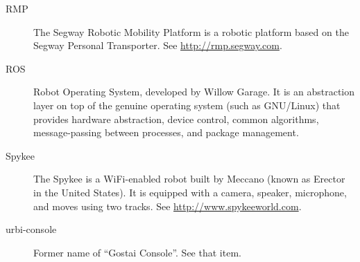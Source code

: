 \begin{description}
\item[RMP] The Segway Robotic Mobility Platform is a robotic platform based
  on the Segway Personal Transporter.  See \url{http://rmp.segway.com}.

\item[ROS] Robot Operating System, developed by Willow Garage.  It is an
  abstraction layer on top of the genuine operating system (such as
  GNU/Linux) that provides hardware abstraction, device control, common
  algorithms, message-passing between processes, and package management.

\item[Spykee] The Spykee is a WiFi-enabled robot built by Meccano (known as
  Erector in the United States). It is equipped with a camera, speaker,
  microphone, and moves using two tracks. See
  \url{http://www.spykeeworld.com}.

\item[urbi-console] Former name of ``Gostai Console''.  See that item.
\end{description}

